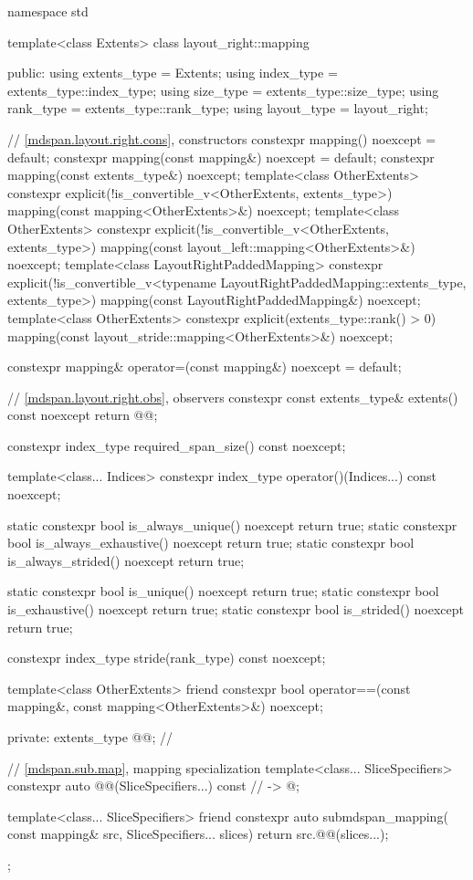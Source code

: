 \begin{codeblock}
namespace std {
  template<class Extents>
  class layout_right::mapping {
  public:
    using extents_type = Extents;
    using index_type = extents_type::index_type;
    using size_type = extents_type::size_type;
    using rank_type = extents_type::rank_type;
    using layout_type = layout_right;

    // \ref{mdspan.layout.right.cons}, constructors
    constexpr mapping() noexcept = default;
    constexpr mapping(const mapping&) noexcept = default;
    constexpr mapping(const extents_type&) noexcept;
    template<class OtherExtents>
      constexpr explicit(!is_convertible_v<OtherExtents, extents_type>)
        mapping(const mapping<OtherExtents>&) noexcept;
    template<class OtherExtents>
      constexpr explicit(!is_convertible_v<OtherExtents, extents_type>)
        mapping(const layout_left::mapping<OtherExtents>&) noexcept;
    template<class LayoutRightPaddedMapping>
      constexpr explicit(!is_convertible_v<typename LayoutRightPaddedMapping::extents_type,
                                           extents_type>)
        mapping(const LayoutRightPaddedMapping&) noexcept;
    template<class OtherExtents>
      constexpr explicit(extents_type::rank() > 0)
        mapping(const layout_stride::mapping<OtherExtents>&) noexcept;

    constexpr mapping& operator=(const mapping&) noexcept = default;

    // \ref{mdspan.layout.right.obs}, observers
    constexpr const extents_type& extents() const noexcept { return @@; }

    constexpr index_type required_span_size() const noexcept;

    template<class... Indices>
      constexpr index_type operator()(Indices...) const noexcept;

    static constexpr bool is_always_unique() noexcept { return true; }
    static constexpr bool is_always_exhaustive() noexcept { return true; }
    static constexpr bool is_always_strided() noexcept { return true; }

    static constexpr bool is_unique() noexcept { return true; }
    static constexpr bool is_exhaustive() noexcept { return true; }
    static constexpr bool is_strided() noexcept { return true; }

    constexpr index_type stride(rank_type) const noexcept;

    template<class OtherExtents>
      friend constexpr bool operator==(const mapping&, const mapping<OtherExtents>&) noexcept;

  private:
    extents_type @@{};    // \expos

    // \ref{mdspan.sub.map},  mapping specialization
    template<class... SliceSpecifiers>
      constexpr auto @@(SliceSpecifiers...) const       // \expos
        -> @\seebelow@;

    template<class... SliceSpecifiers>
      friend constexpr auto submdspan_mapping(
        const mapping& src, SliceSpecifiers... slices) {
          return src.@@(slices...);
      }
  };
}
\end{codeblock}

